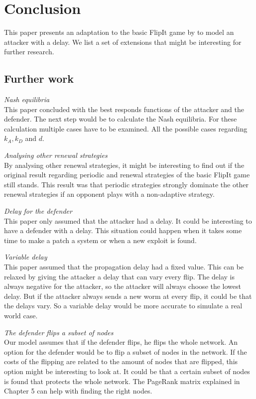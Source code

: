 \chapter{Conclusion}
\label{chapter5:conclusion}

This paper presents an adaptation to the basic FlipIt game by \citep{FlipIt} to model an attacker with a delay.  We list a set of extensions that might be interesting for further research.
\section{Further work}

\begin{description}
\item \textit{Nash equilibria}\\ This paper concluded with the best responds functions of the attacker and the defender. The next step would be to calculate the Nash equilibria. For these calculation multiple cases have to be examined. All the possible cases regarding $k_{A}, k_{D}$ and $d$. 
\item \textit{Analysing other renewal strategies} \\ By analysing other renewal strategies, it might be interesting to find out if the original result regarding periodic and renewal strategies of the basic FlipIt game still stands. This result was that periodic strategies strongly dominate the other renewal strategies if an opponent plays with a non-adaptive strategy. 
\item \textit{Delay for the defender}\\ This paper only assumed that the attacker had a delay. It could be interesting to have a defender with a delay. This situation could happen when it takes some time to make a patch a system or when a new exploit is found. 
\item \textit{Variable delay} \\This paper assumed that the propagation delay had a fixed value. This can be relaxed by giving the attacker a delay that can vary every flip. The delay is always negative for the attacker, so the attacker will always choose the lowest delay. But if the attacker always sends a new worm at every flip, it could be that the delays vary. So a variable delay would be more accurate to simulate a real world case. 
\item \textit{The defender flips a subset of nodes} \\ Our model assumes that if the defender flips, he flips the whole network. An option for the defender would be to flip a subset of nodes in the network. If the costs of the flipping are related to the amount of nodes that are flipped, this option might be interesting to look at. It could be that a certain subset of nodes is found that protects the whole network. The PageRank matrix explained in Chapter 5 can help with finding the right nodes. \\

\end{description}



